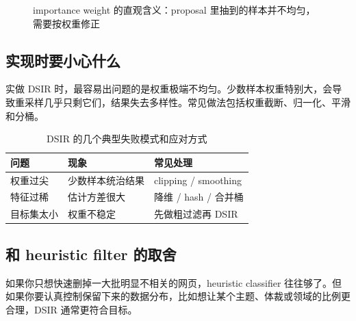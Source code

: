 \begin{figure}[H]
\centering
{}
\caption{importance weight 的直观含义：proposal 里抽到的样本并不均匀，需要按权重修正}
\end{figure}

\subsection{实现时要小心什么}

实做 DSIR 时，最容易出问题的是权重极端不均匀。少数样本权重特别大，会导致重采样几乎只剩它们，结果失去多样性。常见做法包括权重截断、归一化、平滑和分桶。

\begin{table}[H]
\centering
\small
\renewcommand{\arraystretch}{1.15}
\begin{tabular}{p{3.0cm}p{4.2cm}p{4.2cm}}
\toprule
\textbf{问题} & \textbf{现象} & \textbf{常见处理} \\
\midrule
权重过尖 & 少数样本统治结果 & clipping / smoothing \\
特征过稀 & 估计方差很大 & 降维 / hash / 合并桶 \\
目标集太小 & 权重不稳定 & 先做粗过滤再 DSIR \\
\bottomrule
\end{tabular}
\caption{DSIR 的几个典型失败模式和应对方式}
\end{table}

\subsection{和 heuristic filter 的取舍}

如果你只想快速删掉一大批明显不相关的网页，heuristic classifier 往往够了。但如果你要认真控制保留下来的数据分布，比如想让某个主题、体裁或领域的比例更合理，DSIR 通常更符合目标。


